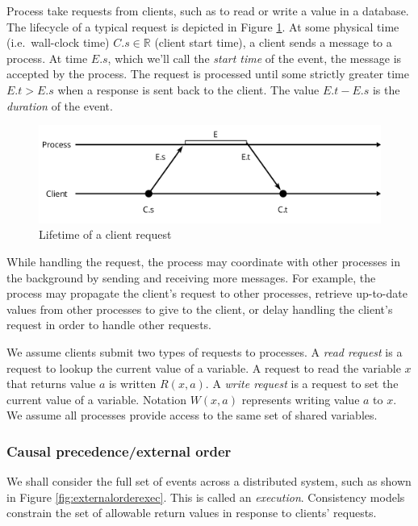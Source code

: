 \documentclass[]             %
{NASA}                       %
\theoremstyle{definition}
\begin{document}
Process take requests from clients, such as to read or write a value
in a database. The lifecycle of a typical request is depicted in
Figure \ref{fig:request}. At some physical time (i.e.~wall-clock time)
\(C.s \in \mathbb{R}\) (client start time), a client sends a message
to a process. At time \(E.s\), which we'll call the \emph{start time}
of the event, the message is accepted by the process. The request is
processed until some strictly greater time \(E.t > E.s\) when a
response is sent back to the client. The value \(E.t - E.s\) is the
\emph{duration} of the event.

\begin{figure}[h]
  \center
  \includegraphics[scale=0.4]{images/request.png}
  \caption{Lifetime of a client request}
  \label{fig:request}
\end{figure}

While handling the request, the process may coordinate with other
processes in the background by sending and receiving more messages. For
example, the process may propagate the client's request to other
processes, retrieve up-to-date values from other processes to give to
the client, or delay handling the client's request in order to handle
other requests.

We assume clients submit two types of requests to processes. A
\emph{read request} is a request to lookup the current value of a
variable. A request to read the variable \(x\) that returns value
\(a\) is written \(R(x,a)\). A \emph{write request} is a request to
set the current value of a variable. Notation \(W(x,a)\) represents
writing value \(a\) to \(x\). We assume all processes provide access
to the same set of shared variables.

\subsubsection{Causal precedence/external order}
\label{causal-precedencehappens-beforeexternal-order}

We shall consider the full set of events across a distributed system,
such as shown in Figure \ref{fig:externalorderexec}.  This is called an
\emph{execution}. Consistency models constrain the set of allowable
return values in response to clients' requests.
\end{document}
